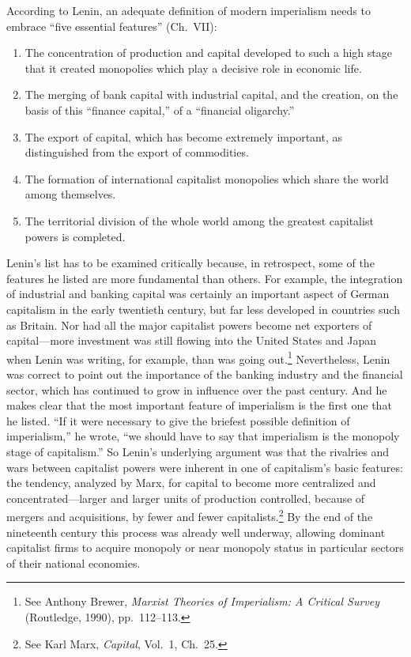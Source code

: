 According to Lenin, an adequate definition of modern imperialism needs to embrace ``five essential features'' (Ch.\ VII):

\begin{enumerate}
\item The concentration of production and capital developed to such a high stage that it created monopolies which play a decisive role in economic life.
\item The merging of bank capital with industrial capital, and the creation, on the basis of this ``finance capital,'' of a ``financial oligarchy.''
\item The export of capital, which has become extremely important, as distinguished from the export of commodities.
\item The formation of international capitalist monopolies which share the world among themselves.
\item The territorial division of the whole world among the greatest capitalist powers is completed.
\end{enumerate}

Lenin's list has to be examined critically because, in retrospect, some of the features he listed are more fundamental than others. For example, the integration of industrial and banking capital was certainly an important aspect of German capitalism in the early twentieth century, but far less developed in countries such as Britain. Nor had all the major capitalist powers become net exporters of capital---more investment was still flowing into the United States and Japan when Lenin was writing, for example, than was going out.\footnote{See Anthony Brewer, \emph{Marxist Theories of Imperialism: A Critical Survey} (Routledge, 1990), pp.\ 112--113.} Nevertheless, Lenin was correct to point out the importance of the banking industry and the financial sector, which has continued to grow in influence over the past century. And he makes clear that the most important feature of imperialism is the first one that he listed. ``If it were necessary to give the briefest possible definition of imperialism,'' he wrote, ``we should have to say that imperialism is the monopoly stage of capitalism.'' So Lenin's underlying argument was that the rivalries and wars between capitalist powers were inherent in one of capitalism's basic features: the tendency, analyzed by Marx, for capital to become more centralized and concentrated---larger and larger units of production controlled, because of mergers and acquisitions, by fewer and fewer capitalists.\footnote{See Karl Marx, \emph{Capital}, Vol.\ 1, Ch.\ 25.} By the end of the nineteenth century this process was already well underway, allowing dominant capitalist firms to acquire monopoly or near monopoly status in particular sectors of their national economies.

